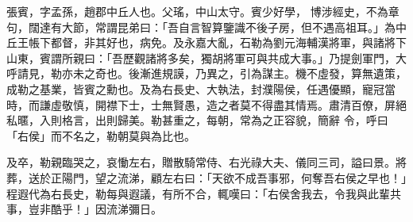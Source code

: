 \begin{pinyinscope}
 張賓，字孟孫，趙郡中丘人也。父瑤，中山太守。賓少好學，
 博涉經史，不為章句，闊達有大節，常謂昆弟曰：「吾自言智算鑒識不後子房，但不遇高祖耳。」為中丘王帳下都督，非其好也，病免。及永嘉大亂，石勒為劉元海輔漢將軍，與諸將下山東，賓謂所親曰：「吾歷觀諸將多矣，獨胡將軍可與共成大事。」乃提劍軍門，大呼請見，勒亦未之奇也。後漸進規謨，乃異之，引為謀主。機不虛發，算無遺策，成勒之基業，皆賓之勳也。及為右長史、大執法，封濮陽侯，任遇優顯，寵冠當時，而謙虛敬慎，開襟下士，士無賢愚，造之者莫不得盡其情焉。肅清百僚，屏絕私暱，入則格言，出則歸美。勒甚重之，每朝，常為之正容貌，簡辭
 令，呼曰「右侯」而不名之，勒朝莫與為比也。



 及卒，勒親臨哭之，哀慟左右，贈散騎常侍、右光祿大夫、儀同三司，謚曰景。將葬，送於正陽門，望之流涕，顧左右曰：「天欲不成吾事邪，何奪吾右侯之早也！」程遐代為右長史，勒每與遐議，有所不合，輒嘆曰：「右侯舍我去，令我與此輩共事，豈非酷乎！」因流涕彌日。



\end{pinyinscope}